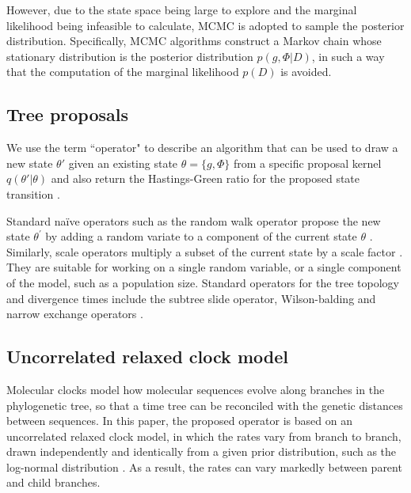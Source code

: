 \documentclass{bmcart}
\begin{document}
However, due to the state space being large to explore and the marginal likelihood being infeasible to calculate, MCMC is adopted to sample the posterior distribution. Specifically, MCMC algorithms construct a Markov chain whose stationary distribution is the posterior distribution $p(g,\Phi |D)$, in such a way that the computation of the marginal likelihood $p (D)$ is avoided.
\subsection*{Tree proposals}
\label{treeproposals}
We use the term ``operator" to describe an algorithm that can be used to draw a new state $\theta'$ given an existing state $\theta = \{g,\Phi\}$ from a specific proposal kernel $q(\theta'|\theta)$ and also return the Hastings-Green ratio for the proposed state transition \cite{hastings1970monte,green1995reversible}.

Standard na\"{i}ve operators such as the random walk operator propose the new state $\theta^\prime$ by adding a random variate to a component of the current state $\theta$ \cite{suchard2005stochastic}. Similarly, scale operators multiply a subset of the current state by a scale factor \cite{higuchi1997monte}. They are suitable for working on a single random variable, or a single component of the model, such as a population size. Standard operators for the tree topology and divergence times include the subtree slide operator, Wilson-balding and narrow exchange operators \cite{drummond2002estimatingdata,hohna2008clock}.

\subsection*{Uncorrelated relaxed clock model}
Molecular clocks model how molecular sequences evolve along branches in the phylogenetic tree, so that a time tree can be reconciled with the genetic distances between sequences. In this paper, the proposed operator is based on an uncorrelated relaxed clock model, in which the rates vary from branch to branch, drawn independently and identically from a given prior distribution, such as the log-normal distribution \cite{drummond2006relaxed}. As a result, the rates can vary markedly between parent and child branches.
\end{document}
